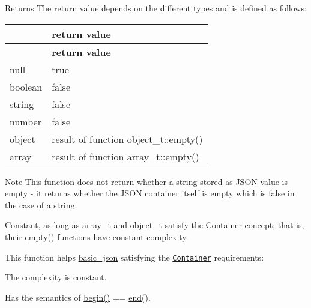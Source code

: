 \begin{DoxyReturn}{Returns}
The return value depends on the different types and is defined as follows\+: \tabulinesep=1mm
\begin{longtabu} spread 0pt [c]{*2{|X[-1]}|}
\hline
{}&{\bf return value  }\\
\endfirsthead
\hline
\endfoot
\hline
{}&{\bf return value  }\\
\endhead
null &{\ttfamily true} \\
boolean &{\ttfamily false} \\
string &{\ttfamily false} \\
number &{\ttfamily false} \\
object &result of function {\ttfamily object\+\_\+t\+::empty()} \\
array &result of function {\ttfamily array\+\_\+t\+::empty()} \\
\end{longtabu}

\end{DoxyReturn}
\begin{DoxyNote}{Note}
This function does not return whether a string stored as J\+S\+ON value is empty -\/ it returns whether the J\+S\+ON container itself is empty which is false in the case of a string.
\end{DoxyNote}
Constant, as long as \hyperlink{classnlohmann_1_1basic__json_a4c409f1b6d9caf3412c78af9a5883fed}{array\+\_\+t} and \hyperlink{classnlohmann_1_1basic__json_a3cdea044cc3ecba1c4f9874a89daf6e4}{object\+\_\+t} satisfy the Container concept; that is, their {\ttfamily \hyperlink{classnlohmann_1_1basic__json_a1a86d444bfeaa9518d2421aedd74444a}{empty()}} functions have constant complexity.

This function helps {\ttfamily \hyperlink{classnlohmann_1_1basic__json}{basic\+\_\+json}} satisfying the \href{http://en.cppreference.com/w/cpp/concept/Container}{\tt Container} requirements\+:
\begin{DoxyItemize}
\item The complexity is constant.
\item Has the semantics of {\ttfamily \hyperlink{classnlohmann_1_1basic__json_a0ff28dac23f2bdecee9564d07f51dcdc}{begin()} == \hyperlink{classnlohmann_1_1basic__json_a13e032a02a7fd8a93fdddc2fcbc4763c}{end()}}.
\end{DoxyItemize}

